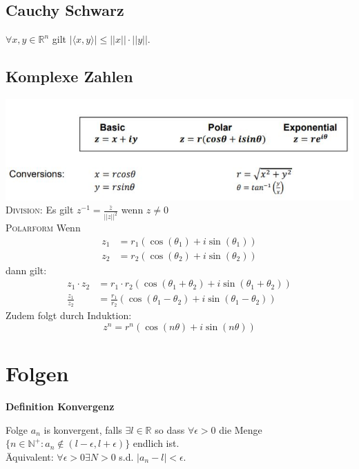 \documentclass[25pt]{sciposter}
\newcommand{\R}{\mathbb{R}}
\newenvironment{method}[1]{\begin{mdframed}[backgroundcolor=blue!10,innertopmargin=15pt, innerbottommargin=15pt]
		\textbf{#1 }
	}
	{ 
	\end{mdframed}
}
\begin{document}
\begin{multicols}{3}
\subsection*{Cauchy Schwarz}
$\forall x,y\in \R^n$ gilt $|\langle x,y\rangle| \leq ||x||\cdot||y||$.

\subsection*{Komplexe Zahlen}
\includegraphics[scale=1.4]{complex.jpg}\\
\textsc{Division:} Es gilt $z^{-1} = \frac{\bar{z}}{||z||^2}$ wenn $z \not = 0$\\
\textsc{Polarform} Wenn \begin{align*}
z_1 &= r_1(\cos(\theta_1) + i\sin(\theta_1))\\
z_2 &= r_2(\cos(\theta_2) + i\sin(\theta_2))
\end{align*}
dann gilt: 
\begin{align*}
z_1 \cdot z_2 &= r_1 \cdot r_2 \left(\cos(\theta_1 + \theta_2) + i\sin(\theta_1 + \theta_2)\right)\\
\frac{z_1}{z_2} &= \frac{r_1}{r_2}\left(\cos(\theta_1 - \theta_2) + i\sin(\theta_1 - \theta_2)\right)
\end{align*}
Zudem folgt durch Induktion:
$$z^n = r^n (\cos(n\theta) + i \sin(n \theta))$$







\section{Folgen}

\begin{method}{Definition Konvergenz}
Folge $a_n$ is konvergent, falls $\exists l \in \mathbb{R}$ so dass $\forall \epsilon > 0$ die Menge $\{n \in \mathbb{N}^+: a_n \not \in (l-\epsilon, l + \epsilon)\}$ endlich ist. \\
Äquivalent: $\forall \epsilon > 0 \exists N >  0$ s.d. $|a_n - l|< \epsilon$.
\end{method}


\end{multicols}
\end{document}
